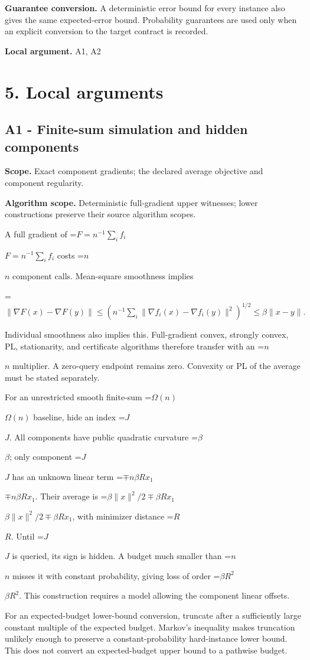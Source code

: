 \documentclass[10pt,a4paper]{article}
\newcommand{\AtlasMath}[1]{\par\begingroup\centering\setbox0=\hbox{$\displaystyle #1$}\ifdim\wd0>1.4\linewidth\typeout{ATLAS WIDE FORMULA: \the\wd0}\fi\ifdim\wd0>\linewidth\resizebox{\linewidth}{!}{\box0}\else\box0\fi\par\endgroup}
\newcommand{\AtlasInlineMath}[1]{\begingroup\setbox0=\hbox{$#1$}\ifdim\wd0>.4\linewidth\endgroup\AtlasMath{#1}\else\endgroup$#1$\fi}
\begin{document}
\textbf{Guarantee conversion.} A deterministic error bound for every instance also gives the same expected-error bound. Probability guarantees are used only when an explicit conversion to the target contract is recorded.

\textbf{Local argument.} A1, A2

\section{5. Local arguments}
\subsection{A1 - Finite-sum simulation and hidden components}
\textbf{Scope.} Exact component gradients; the declared average objective and component regularity.

\textbf{Algorithm scope.} Deterministic full-gradient upper witnesses; lower constructions preserve their source algorithm scopes.

A full gradient of \AtlasInlineMath{F=n^{-1}\sum_i f_i} costs \AtlasInlineMath{n} component calls. Mean-square smoothness implies

\AtlasMath{\|\nabla F(x)-\nabla F(y)\|
\le(n^{-1}\sum_i\|\nabla f_i(x)-\nabla f_i(y)\|^2)^{1/2}
\le\beta\|x-y\|.}

Individual smoothness also implies this. Full-gradient convex, strongly convex, PL, stationarity, and certificate algorithms therefore transfer with an \AtlasInlineMath{n} multiplier. A zero-query endpoint remains zero. Convexity or PL of the average must be stated separately.

For an unrestricted smooth finite-sum \AtlasInlineMath{\Omega(n)} baseline, hide an index \AtlasInlineMath{J}. All components have public quadratic curvature \AtlasInlineMath{\beta}; only component \AtlasInlineMath{J} has an unknown linear term \AtlasInlineMath{\mp n\beta R x_1}. Their average is
\AtlasInlineMath{\beta\|x\|^2/2\mp\beta Rx_1}, with minimizer distance \AtlasInlineMath{R}. Until \AtlasInlineMath{J} is queried, its sign is hidden. A budget much smaller than \AtlasInlineMath{n} misses it with constant probability, giving loss of order \AtlasInlineMath{\beta R^2}. This construction requires a model allowing the component linear offsets.

For an expected-budget lower-bound conversion, truncate after a sufficiently large constant multiple of the expected budget. Markov's inequality makes truncation unlikely enough to preserve a constant-probability hard-instance lower bound. This does not convert an expected-budget upper bound to a pathwise budget.
\end{document}
